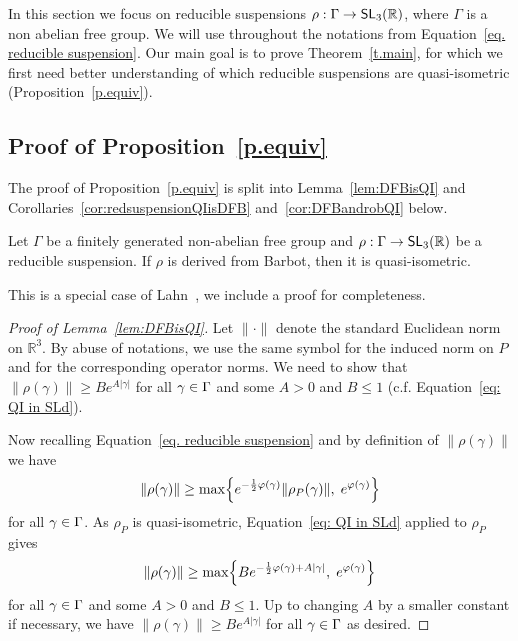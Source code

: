 \documentclass[AHL,Unicode,longabstracts]{cedram}
\DeclareMathOperator{\SL}{\mathsf{SL}}
\newcommand{\R}{\mathbb{R}}
\newcommand{\RR}{\R}
\renewcommand*{\to}{\mathchoice{\longrightarrow}{\rightarrow}{\rightarrow}{\rightarrow}}
\let\originalleft\left
\let\originalright\right
\renewcommand{\left}{\mathopen{}\mathclose\bgroup\originalleft}
\renewcommand{\right}{\aftergroup\egroup\originalright}
\let\oldin\in
\renewcommand{\in}{\mathchoice{\oldin}{\oldin}{\,\oldin\,}{\,\oldin\,}}
\newcommand{\RR}{\mathbb{R}}
\begin{document}
In this section we focus on reducible suspensions $\rho:\Gamma\to\SL_3(\R)$, where $\Gamma$ is a non abelian free group. We will use throughout the notations from Equation~\eqref{eq. reducible suspension}. Our main goal is to prove Theorem~\ref{t.main}, for which we first need better understanding of which reducible suspensions are quasi-isometric (Proposition~\ref{p.equiv}).


\subsection{Proof of Proposition~\ref{p.equiv}}\label{ss.proofpropequiv}



The proof of Proposition~\ref{p.equiv} is split into Lemma~\ref{lem:DFBisQI} and Corollaries~\ref{cor:redsuspensionQIisDFB} and~\ref{cor:DFBandrobQI} below.



\begin{lemm}\label{lem:DFBisQI}
Let $\Gamma$ be a finitely generated non-abelian free group and $\rho:\Gamma \to \SL_3(\R)$ be a reducible suspension. If $\rho$ is derived from Barbot, then it is quasi-isometric.
\end{lemm}


This is a special case of Lahn~\cite[Proposition~3.4]{lahn}, we include a proof for completeness.

\begin{proof}[Proof of Lemma~\ref{lem:DFBisQI}] Let $\|\cdot\|$ denote the standard Euclidean norm on $\RR^3$.
By abuse of notations, we use the same symbol for the induced norm on $P$ and for the corresponding operator norms. We need to show that $\| \rho(\gamma)\|\geq Be^{A\vert\gamma\vert}$ for all $\gamma\in\Gamma$ and some $A>0$ and $B\leq 1$ (c.f. Equation~\eqref{eq: QI in SLd}).


Now recalling Equation~\eqref{eq. reducible suspension} and by definition of $\|\rho(\gamma)\|$ we have
\[
\| \rho(\gamma)\|\geq \max\left\{ e^{-\frac{1}{2}\varphi(\gamma)}\|\rho_P(\gamma)\|,\; e^{\varphi(\gamma)} \right\}
\]
for all $\gamma\in\Gamma$.
As $\rho_P$ is quasi-isometric, Equation~\eqref{eq: QI in SLd} applied to $\rho_P$ gives
\[
\| \rho(\gamma)\|\geq \max\left\{ Be^{-\frac{1}{2}\varphi(\gamma)+A\vert\gamma\vert},\; e^{\varphi(\gamma)}\right\}
\]
for all $\gamma\in\Gamma$ and some $A>0$ and $B\leq 1$.
Up to changing $A$ by a smaller constant if necessary, we have $\| \rho(\gamma)\|\geq Be^{A\vert\gamma\vert}$ for all $\gamma\in\Gamma$ as desired.
\end{proof}
\end{document}
